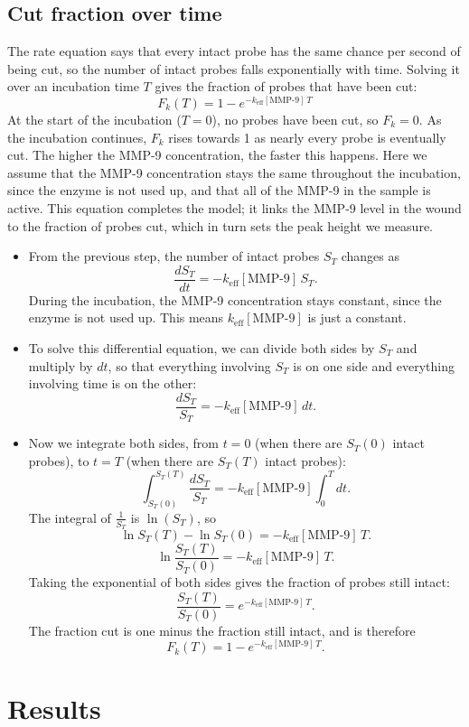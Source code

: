 \documentclass[10pt,a4paper]{article}
\numberwithin{equation}{section}
\newcommand{\keff}{k_{\mathrm{eff}}}
\newcommand{\MMP}{[\text{MMP-9}]}
\newcommand{\dropdown}{\par\medskip}
\begin{document}
\subsection{Cut fraction over time}
The rate equation says that every intact probe has the same chance per second of being cut, so the number of intact probes falls exponentially with time. Solving it over an incubation time $T$ gives the fraction of probes that have been cut:
\[ F_k(T) = 1 - e^{-\keff\MMP\,T} \]
At the start of the incubation ($T = 0$), no probes have been cut, so $F_k = 0$. As the incubation continues, $F_k$ rises towards 1 as nearly every probe is eventually cut. The higher the MMP-9 concentration, the faster this happens. Here we assume that the MMP-9 concentration stays the same throughout the incubation, since the enzyme is not used up, and that all of the MMP-9 in the sample is active. This equation completes the model; it links the MMP-9 level in the wound to the fraction of probes cut, which in turn sets the peak height we measure.

\dropdown
\begin{itemize}
  \item From the previous step, the number of intact probes $S_T$ changes as
  \[ \frac{dS_T}{dt} = -\keff\MMP\,S_T. \]
  During the incubation, the MMP-9 concentration stays constant, since the enzyme is not used up. This means $\keff\MMP$ is just a constant.
  \item To solve this differential equation, we can divide both sides by $S_T$ and multiply by $dt$, so that everything involving $S_T$ is on one side and everything involving time is on the other:
  \[ \frac{dS_T}{S_T} = -\keff\MMP\,dt. \]
  \item Now we integrate both sides, from $t = 0$ (when there are $S_T(0)$ intact probes), to $t = T$ (when there are $S_T(T)$ intact probes):
  \[ \int_{S_T(0)}^{S_T(T)}\frac{dS_T}{S_T} = -\keff\MMP\int_0^T dt. \]
  The integral of $\frac{1}{S_T}$ is $\ln(S_T)$, so
  \[ \ln S_T(T) - \ln S_T(0) = -\keff\MMP\,T. \]
  \[ \ln\frac{S_T(T)}{S_T(0)} = -\keff\MMP\,T. \]
  Taking the exponential of both sides gives the fraction of probes still intact:
  \[ \frac{S_T(T)}{S_T(0)} = e^{-\keff\MMP\,T}. \]
  The fraction cut is one minus the fraction still intact, and is therefore
  \[ F_k(T) = 1 - e^{-\keff\MMP\,T}. \]
\end{itemize}

\section{Results}
\label{sec:results}
\end{document}
